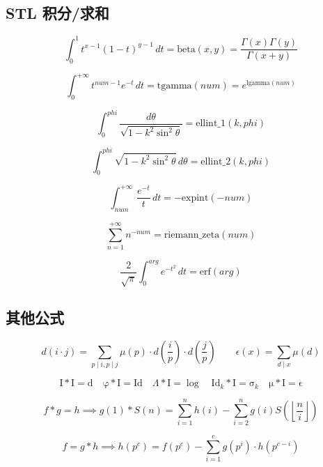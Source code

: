 \documentclass[a4paper,landscape,twocolumn]{ctexart}
\begin{document}
\subsection{STL 积分/求和}

$$
\int_0^1 t^{x-1}(1-t)^{y-1}\,dt = \mathrm{beta}(x,y) = \frac{\Gamma(x)\Gamma(y)}{\Gamma(x+y)}
$$

$$
\int_0^{+\infty} t^{num-1}e^{-t}\,dt = \mathrm{tgamma}(num) = e^{\mathrm{lgamma}(num)}
$$

$$
\int_0^{phi} \frac{d\theta}{\sqrt{1-k^2\sin^2\theta}} = \mathrm{ellint\_1}(k,phi)
$$

$$
\int_0^{phi} \sqrt{1-k^2\sin^2\theta}\,d\theta = \mathrm{ellint\_2}(k,phi)
$$

$$
\int_{num}^{+\infty} \frac{e^{-t}}{t}\,dt = -\mathrm{expint}(-num)
$$

$$
\sum_{n=1}^{+\infty} n^{-num} = \mathrm{riemann\_zeta}(num)
$$

$$
\frac{2}{\sqrt{\pi}}\int_0^{arg} e^{-t^2}\,dt = \mathrm{erf}(arg)
$$

%

\subsection{其他公式}


$$
d(i \cdot j) = \sum_{p \mid i, p \mid j} \mu (p) \cdot d (\frac{i}{p}) \cdot d (\frac{j}{p})
\qquad
\epsilon (x) = \sum \limits_{d \mid x} \mu (d)
$$

$$
\mathrm{I} * \mathrm{I} = \mathrm{d}
\quad
\mathrm{\varphi} * \mathrm{I} = \mathrm{Id}
\quad
\Lambda * \mathrm{I} = \log
\quad
\mathrm{Id}_k * \mathrm{I} = \mathrm{\sigma}_k
\quad
\mathrm{\mu} * \mathrm{I} = \mathrm{\epsilon}
$$

$$
f * g = h \implies g(1) * S(n) = \sum_{i = 1}^{n} h(i) - \sum_{i = 2}^{n} g(i) S(\left \lfloor \frac{n}{i} \right \rfloor)
$$

$$
f = g * h \implies h(p ^ c) = f(p ^ c) - \sum_{i = 1}^{c} g(p ^ i) \cdot h(p ^ {c-i})
$$
\end{document}
